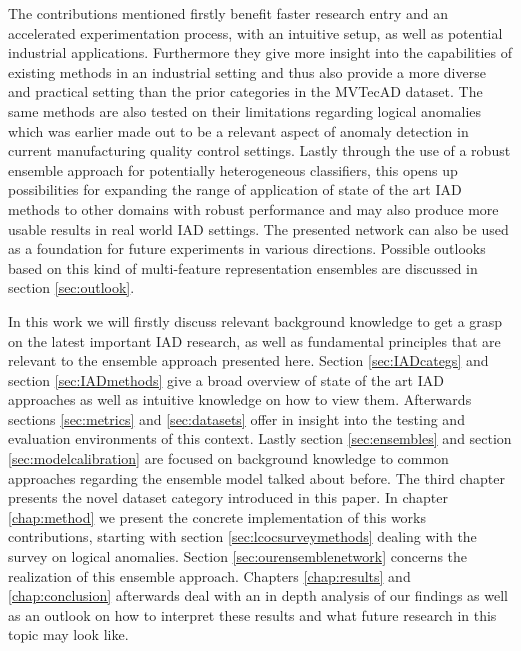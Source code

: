 The contributions mentioned firstly benefit faster research entry and an accelerated experimentation process, with an intuitive setup, 
as well as potential industrial applications. 
Furthermore they give more insight into the capabilities of existing methods in an industrial setting and thus also provide a more 
diverse and practical setting than the prior categories in the MVTecAD \cite{LOCODentsAndScratchesBergmann2022} dataset. The same methods are also tested on their limitations 
regarding logical anomalies which was earlier made out to be a relevant aspect of anomaly detection in current manufacturing quality control 
settings. Lastly through the use of a robust ensemble approach for potentially heterogeneous classifiers, this opens up possibilities for expanding 
the range of application of state of the art IAD methods to other domains with robust performance and may also produce more usable results in real 
world IAD settings. The presented network can also be used as a foundation for future experiments in 
various directions. Possible outlooks based on this kind of multi-feature representation ensembles are discussed in section \ref{sec:outlook}.
\newline
\newline

In this work we will firstly discuss relevant background knowledge to get a grasp on the latest important IAD research, as well as fundamental principles that are relevant to the ensemble 
approach presented here. Section \ref{sec:IADcategs} and section \ref{sec:IADmethods} give a broad overview of state of the art IAD approaches as well as intuitive knowledge on how to 
view them. Afterwards sections \ref{sec:metrics} and \ref{sec:datasets} offer in insight into the testing and evaluation environments of this context. Lastly section \ref{sec:ensembles} and 
section \ref{sec:modelcalibration} are focused on background knowledge to common approaches regarding the ensemble model talked about before.\newline
The third chapter presents the novel dataset category introduced in this paper.
In chapter \ref{chap:method} we present the concrete implementation of this works contributions, starting with section \ref{sec:lcocsurveymethods} dealing with the survey on logical anomalies. 
Section \ref{sec:ourensemblenetwork} concerns the realization of this ensemble approach.
\newline 
Chapters \ref{chap:results} and \ref{chap:conclusion} afterwards deal with an in depth analysis of our findings as well as an outlook on how to interpret these results and what future research 
in this topic may look like.






